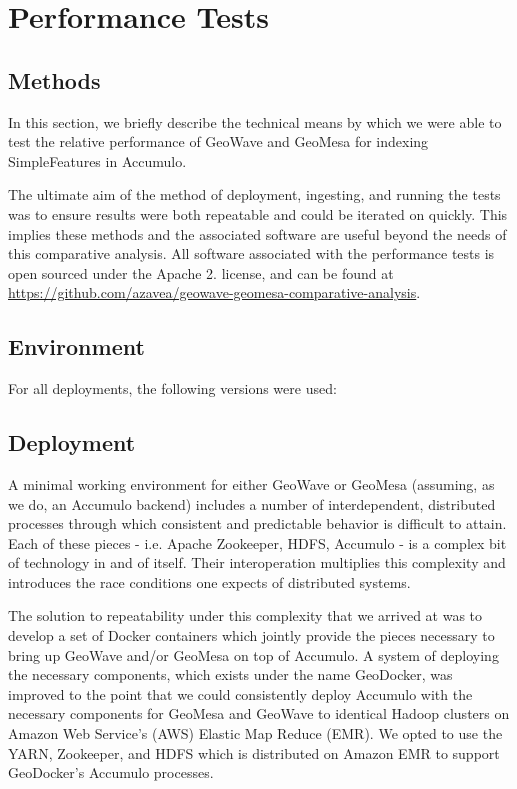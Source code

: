 \section{Performance Tests}
\label{sec:performance}


\subsection{Methods}
\label{sec:performance:methods}

In this section, we briefly describe the technical means by which we were able to test the relative performance of GeoWave and GeoMesa for indexing SimpleFeatures in Accumulo.

The ultimate aim of the method of deployment, ingesting, and running the tests was to ensure results were both repeatable and could be iterated on quickly.
This implies these methods and the associated software are useful beyond the needs of this comparative analysis.
All software associated with the performance tests is open sourced under the Apache 2.
license, and can be found at \url{https://github.com/azavea/geowave-geomesa-comparative-analysis}.


\subsection{Environment}
\label{sec:performance:environment}

For all deployments, the following versions were used:


\subsection{Deployment}
\label{sec:performance:deployment}

A minimal working environment for either GeoWave or GeoMesa (assuming, as we do, an Accumulo backend) includes a number of interdependent, distributed processes through which consistent and predictable behavior is difficult to attain.
Each of these pieces - i.e. Apache Zookeeper, HDFS, Accumulo - is a complex bit of technology in and of itself. Their interoperation multiplies this complexity and introduces the race conditions one expects of distributed systems.

The solution to repeatability under this complexity that we arrived at was to develop a set of Docker containers which jointly provide the pieces necessary to bring up GeoWave and/or GeoMesa on top of Accumulo.
A system of deploying the necessary components, which exists under the name GeoDocker, was improved to the point that we could consistently deploy Accumulo with the necessary components for GeoMesa and GeoWave to identical Hadoop clusters on Amazon Web Service's (AWS) Elastic Map Reduce (EMR).
We opted to use the YARN, Zookeeper, and HDFS which is distributed on Amazon EMR to support GeoDocker’s Accumulo processes.

